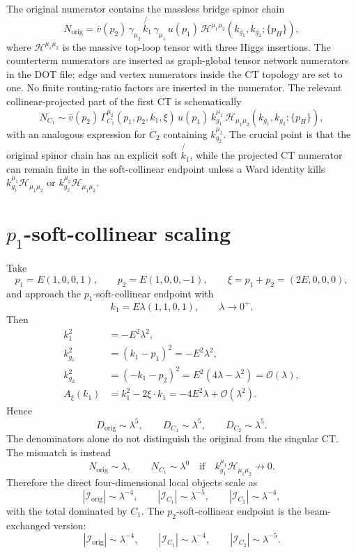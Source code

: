 \documentclass[11pt]{report}
\newcommand{\slashp}[1]{\not{#1}}
\newcommand{\kgone}{k_{g_1}}
\newcommand{\kgtwo}{k_{g_2}}
\newcommand{\Axi}{A_\xi}
\newcommand{\order}[1]{\mathcal{O}\!\left(#1\right)}
\newcommand{\Hamp}{\mathcal{H}}
\newcommand{\Iorig}{\mathcal{I}_{\mathrm{orig}}}
\newcommand{\ICTone}{\mathcal{I}_{C_1}}
\newcommand{\ICTtwo}{\mathcal{I}_{C_2}}
\begin{document}
The original numerator contains the massless bridge spinor chain
\[
  N_{\mathrm{orig}}
  =
  \bar v(p_2)\,\gamma_{\mu_2}\,\slashp{k_1}\,\gamma_{\mu_1}\,u(p_1)\,
  \Hamp^{\mu_1\mu_2}(\kgone,\kgtwo;\{p_H\}),
  \label{eq:orig-num}
\]
where \(\Hamp^{\mu_1\mu_2}\) is the massive top-loop tensor with three Higgs
insertions. The counterterm numerators are inserted as graph-global tensor
network numerators in the DOT file; edge and vertex numerators inside the CT
topology are set to one. No finite routing-ratio factors are inserted in the
numerator. The relevant collinear-projected part of the first CT is
schematically
\[
  N_{C_1}
  \sim
  \bar v(p_2)\,\Gamma_{C_1}^{\mu_2}(p_1,p_2,k_1,\xi)\,u(p_1)\,
  \kgone^{\mu_1}\,
  \Hamp_{\mu_1\mu_2}(\kgone,\kgtwo;\{p_H\}),
  \label{eq:ct1-num}
\]
with an analogous expression for \(C_2\) containing \(\kgtwo^{\mu_2}\). The
crucial point is that the original spinor chain has an explicit soft
\(\slashp{k_1}\), while the projected CT numerator can remain finite in the
soft-collinear endpoint unless a Ward identity kills
\(\kgone^{\mu_1}\Hamp_{\mu_1\mu_2}\) or
\(\kgtwo^{\mu_2}\Hamp_{\mu_1\mu_2}\).

\section{\(p_1\)-soft-collinear scaling}

Take
\[
  p_1 = E(1,0,0,1),\qquad
  p_2 = E(1,0,0,-1),\qquad
  \xi = p_1+p_2 = (2E,0,0,0),
\]
and approach the \(p_1\)-soft-collinear endpoint with
\[
  k_1 = E\lambda(1,1,0,1),\qquad \lambda\to 0^+ .
\]
Then
\begin{align}
  k_1^2 &= -E^2\lambda^2,\\
  \kgone^2 &= (k_1-p_1)^2 = -E^2\lambda^2,\\
  \kgtwo^2 &= (-k_1-p_2)^2 = E^2(4\lambda-\lambda^2)
             = \order{\lambda},\\
  \Axi(k_1) &= k_1^2 -2\xi\cdot k_1
             = -4E^2\lambda+\order{\lambda^2}.
\end{align}
Hence
\[
  D_{\mathrm{orig}}\sim \lambda^5,\qquad
  D_{C_1}\sim \lambda^5,\qquad
  D_{C_2}\sim \lambda^5 .
\]
The denominators alone do not distinguish the original from the singular CT.
The mismatch is instead
\[
  N_{\mathrm{orig}}\sim \lambda,
  \qquad
  N_{C_1}\sim \lambda^0
  \quad\text{if}\quad
  \kgone^{\mu_1}\Hamp_{\mu_1\mu_2}\not\to 0 .
\]
Therefore the direct four-dimensional local objects scale as
\[
  |\Iorig|\sim \lambda^{-4},\qquad
  |\ICTone|\sim \lambda^{-5},\qquad
  |\ICTtwo|\sim \lambda^{-4},
  \label{eq:4d-scaling-p1}
\]
with the total dominated by \(C_1\). The \(p_2\)-soft-collinear endpoint is
the beam-exchanged version:
\[
  |\Iorig|\sim \lambda^{-4},\qquad
  |\ICTone|\sim \lambda^{-4},\qquad
  |\ICTtwo|\sim \lambda^{-5}.
  \label{eq:4d-scaling-p2}
\]
\end{document}

